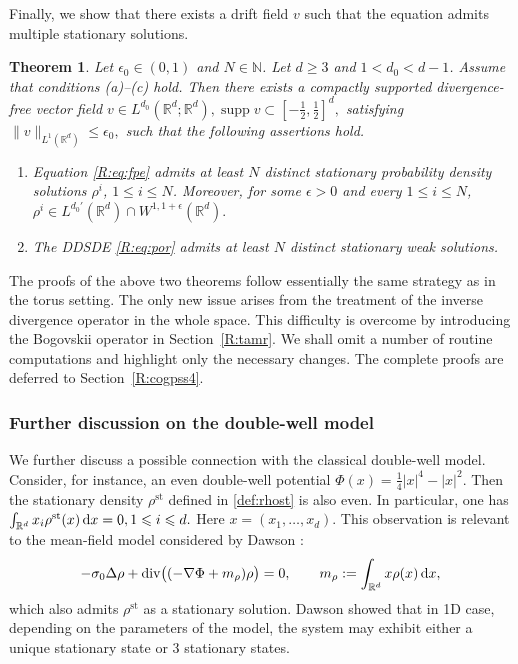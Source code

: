 \documentclass[UTF-8,reqno]{amsart}
\numberwithin{equation}{section}
\newtheorem{theorem}{Theorem}[section]
\theoremstyle{definition}
\def\dif{{\mathord{{\rm d}}}}
\def\geq{\geqslant}
\def\leq{\leqslant}
\def\div{\mathord{{\rm div}}}
\def\dif{{\mathord{{\rm d}}}}
\def\geq{\geqslant}
\def\leq{\leqslant}
\def\div{\mathord{{\rm div}}}
\begin{document}
Finally, we show that there exists a drift field $v$ such
that the  equation admits multiple stationary solutions.

\begin{theorem}\label{R:thm:sta}
Let $\epsilon_0\in(0,1)$ and $N\in\mathbb{N}$. Let $d\geq 3$ and
$1<d_0<d-1$. Assume that conditions \textnormal{(a)}--\textnormal{(c)} hold. Then there exists a
compactly supported divergence-free vector field
$
v\in L^{d_0}(\mathbb{R}^d;\mathbb{R}^d),
\operatorname{supp}v
\subset
 [-\frac12,\frac12 ]^d,
$
satisfying $
\|v\|_{L^1(\mathbb{R}^d)}
\leq
\epsilon_0 ,$
such that the following assertions hold.

\begin{enumerate}
\item
Equation \eqref{R:eq:fpe} 
admits at least $N$ distinct stationary probability density solutions $\rho^i$,
$1\leq i\leq N$. Moreover, for some $\epsilon>0$ and every $1\leq i\leq N$,
$
\rho^i
\in
L^{d_0'}(\mathbb{R}^d)
\cap
W^{1,1+\epsilon}(\mathbb{R}^d).
$

\item
The DDSDE \eqref{R:eq:por} admits at least $N$ distinct stationary  weak
solutions. 
\end{enumerate}
\end{theorem}
 


The proofs of the above two theorems follow essentially the same strategy as
in the torus setting. The only new issue arises from the treatment of the
inverse divergence operator in the whole space. This difficulty is overcome by
introducing the Bogovskii operator in Section~\ref{R:tamr}. We shall omit a number of routine
computations and highlight only the necessary changes. The complete proofs are
deferred to Section~\ref{R:cogpss4}.
 
\subsubsection{Further discussion on the double-well model} 

We further discuss a possible connection with the classical double-well model. Consider, for instance, an even double-well potential
$
\Phi(x)=\frac14 |x|^4- |x|^2 .
$
Then the stationary density $\rho^{\mathrm{st}}$ defined in
\eqref{def:rhost} is also even. In particular,   one has
$
\int_{\mathbb{R}^d} x_i \rho^{\mathrm{st}}(x)\,\dif x=0,
1\leq i\leq d .
$
Here $x=(x_1,\ldots,x_d)$.
This observation is relevant to the mean-field model considered by Dawson
\cite{Daw83}:
\begin{align}
-\sigma_0\Delta\rho
+\div\bigl((-\nabla\Phi+m_\rho)\rho\bigr)
=
0,
\qquad
m_\rho:=\int_{\mathbb{R}^d}x\rho(x)\,\dif x ,\notag
\end{align}which also admits
$\rho^{\mathrm{st}}$ as a stationary solution. Dawson \cite{Daw83} showed that in 1D case, depending on the
parameters of the model, the system may exhibit either a unique stationary
state or 3 stationary states.  
\end{document}
